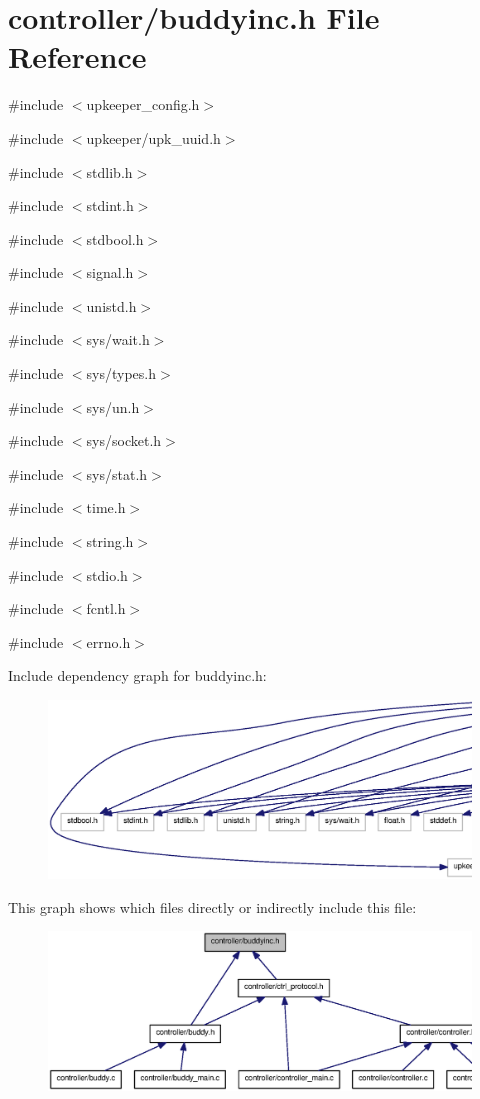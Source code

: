 \section{controller/buddyinc.h File Reference}
\label{buddyinc_8h}
{\ttfamily \#include $<$upkeeper\_\-config.h$>$}\par
{\ttfamily \#include $<$upkeeper/upk\_\-uuid.h$>$}\par
{\ttfamily \#include $<$stdlib.h$>$}\par
{\ttfamily \#include $<$stdint.h$>$}\par
{\ttfamily \#include $<$stdbool.h$>$}\par
{\ttfamily \#include $<$signal.h$>$}\par
{\ttfamily \#include $<$unistd.h$>$}\par
{\ttfamily \#include $<$sys/wait.h$>$}\par
{\ttfamily \#include $<$sys/types.h$>$}\par
{\ttfamily \#include $<$sys/un.h$>$}\par
{\ttfamily \#include $<$sys/socket.h$>$}\par
{\ttfamily \#include $<$sys/stat.h$>$}\par
{\ttfamily \#include $<$time.h$>$}\par
{\ttfamily \#include $<$string.h$>$}\par
{\ttfamily \#include $<$stdio.h$>$}\par
{\ttfamily \#include $<$fcntl.h$>$}\par
{\ttfamily \#include $<$errno.h$>$}\par
Include dependency graph for buddyinc.h:\nopagebreak
\begin{figure}[H]
\begin{center}
\leavevmode
\includegraphics[width=400pt]{buddyinc_8h__incl}
\end{center}
\end{figure}
This graph shows which files directly or indirectly include this file:\nopagebreak
\begin{figure}[H]
\begin{center}
\leavevmode
\includegraphics[width=400pt]{buddyinc_8h__dep__incl}
\end{center}
\end{figure}
